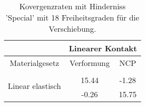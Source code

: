 \begin{table} 
\centering 
\begin{tabular}{c|cc|} 
\cline{2-3} 
 & \multicolumn{2}{|c|}{Linearer Kontakt} \\ 
\hline 
\multicolumn{1}{|c|}{Materialgesetz} & \multicolumn{1}{c|}{Verformung} & \multicolumn{1}{c|}{NCP} \\ 
\hline 
\multicolumn{1}{|c|}{\multirow{3}{*}{Linear elastisch}} &\multicolumn{1}{|c|}{} & \multicolumn{1}{|c|}{} \\ 
\multicolumn{1}{|c|}{} & \multicolumn{1}{|c|}{     15.44} & \multicolumn{1}{|c|}{     -1.28} \\ 
\multicolumn{1}{|c|}{} & \multicolumn{1}{|c|}{     -0.26} & \multicolumn{1}{|c|}{     15.75} \\ 
\hline 
\end{tabular}\caption{Kovergenzraten mit Hinderniss 'Special' mit 18 Freiheitsgraden für die Verschiebung.}\label{tab:Rate_Special_level0}
\end{table} 
